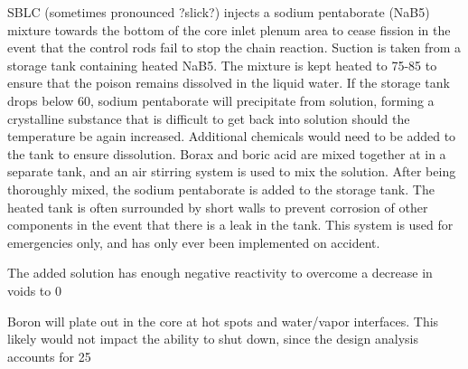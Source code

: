 \documentclass[10pt]{article}
\begin{document}
SBLC (sometimes pronounced ?slick?) injects a sodium pentaborate (NaB5) mixture towards the bottom of the core inlet plenum area to cease fission in the event that the control rods fail to stop the chain reaction. Suction is taken from a storage tank containing heated NaB5. The mixture is kept heated to 75-85 to ensure that the poison remains dissolved in the liquid water. If the storage tank drops below 60, sodium pentaborate will precipitate from solution, forming a crystalline substance that is difficult to get back into solution should the temperature be again increased. Additional chemicals would need to be added to the tank to ensure dissolution. Borax and boric acid are mixed together at  in a separate tank, and an air stirring system is used to mix the solution. After being thoroughly mixed, the sodium pentaborate is added to the storage tank. The heated tank is often surrounded by short walls to prevent corrosion of other components in the event that there is a leak in the tank. This system is used for emergencies only, and has only ever been implemented on accident. 

The added solution has enough negative reactivity to overcome a decrease in voids to 0%

Boron will plate out in the core at hot spots and water/vapor interfaces. This likely would not impact the ability to shut down, since the design analysis accounts for 25%
\end{document}
